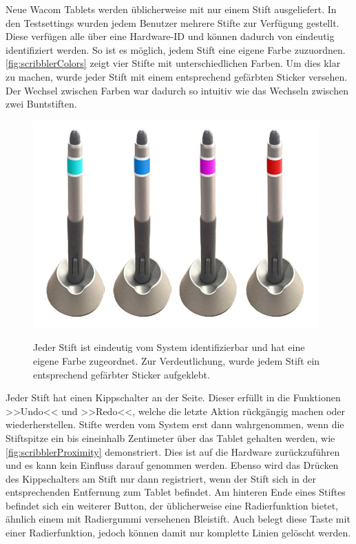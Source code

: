 \medskip Neue Wacom Tablets werden üblicherweise mit nur einem Stift ausgeliefert. In den Testsettings wurden jedem Benutzer mehrere Stifte zur Verfügung gestellt. Diese verfügen alle über eine Hardware-ID und können dadurch von \scribbler eindeutig identifiziert werden. So ist es möglich, jedem Stift eine eigene Farbe zuzuordnen. \autoref{fig:scribblerColors} zeigt vier Stifte mit unterschiedlichen Farben. Um dies klar zu machen, wurde jeder Stift mit einem entsprechend gefärbten Sticker versehen. Der Wechsel zwischen Farben war dadurch so intuitiv wie das Wechseln zwischen zwei Buntstiften.

\begin{figure}
        {\includegraphics[width=1\linewidth]{gfx/scribblerColors}}
		\caption[Tabletstiftfarben]{Jeder Stift ist eindeutig vom System identifizierbar und hat eine eigene Farbe zugeordnet. Zur Verdeutlichung, wurde jedem Stift ein entsprechend gefärbter Sticker aufgeklebt.}\label{fig:scribblerColors}
\end{figure}

Jeder Stift hat einen Kippschalter an der Seite. Dieser erfüllt in \scribbler die Funktionen >>Undo<< und >>Redo<<, welche die letzte Aktion rückgängig machen oder wiederherstellen. 
Stifte werden vom System erst dann wahrgenommen, wenn die Stiftspitze ein bis eineinhalb Zentimeter über das Tablet gehalten werden, wie \autoref{fig:scribblerProximity} demonstriert. Dies ist auf die Hardware zurückzuführen und es kann kein Einfluss darauf genommen werden. Ebenso wird das Drücken des Kippschalters am Stift nur dann registriert, wenn der Stift sich in der entsprechenden Entfernung zum Tablet befindet. Am hinteren Ende eines Stiftes befindet sich ein weiterer Button, der üblicherweise eine Radierfunktion bietet, ähnlich einem mit Radiergummi versehenen Bleistift. Auch \scribbler belegt diese Taste mit einer Radierfunktion, jedoch können damit nur komplette Linien gelöscht werden.

